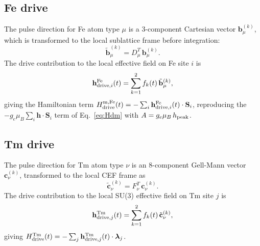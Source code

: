 \documentclass[11pt]{article}
\newcommand{\bS}{\mathbf{S}}
\newcommand{\bh}{\mathbf{h}}
\begin{document}
\subsection{Fe drive}

The pulse direction for Fe atom type $\mu$ is a 3-component Cartesian
vector $\mathbf{b}^{(k)}_\mu$, which is transformed to the local
sublattice frame before integration:
\begin{equation}
\tilde{\mathbf{b}}^{(k)}_\mu = D_\mu^T\,\mathbf{b}^{(k)}_\mu.
\end{equation}
The drive contribution to the local effective field on Fe site $i$ is
\begin{equation}
\mathbf{h}^{\rm Fe}_{{\rm drive},i}(t)
= \sum_{k=1}^{2} f_k(t)\,\tilde{\mathbf{b}}^{(k)}_\mu,
\end{equation}
giving the Hamiltonian term
$H_{\rm drive}^{\rm m,Fe}(t) = -\sum_i \mathbf{h}^{\rm Fe}_{{\rm drive},i}(t)\cdot\bS_i$,
reproducing the $-g_e\mu_B\sum_i\bh\cdot\bS_i$ term of
Eq.~\eqref{eq:Hdm} with $A = g_e\mu_B\,h_{\rm peak}$.

\subsection{Tm drive}

The pulse direction for Tm atom type $\nu$ is an 8-component Gell-Mann
vector $\mathbf{c}^{(k)}_\nu$, transformed to the local CEF frame as
\begin{equation}
\tilde{\mathbf{c}}^{(k)}_\nu = F_\nu^T\,\mathbf{c}^{(k)}_\nu.
\end{equation}
The drive contribution to the local SU(3) effective field on Tm site $j$
is
\begin{equation}
\mathbf{h}^{\rm Tm}_{{\rm drive},j}(t)
= \sum_{k=1}^{2} f_k(t)\,\tilde{\mathbf{c}}^{(k)}_\nu,
\end{equation}
giving
$H_{\rm drive}^{\rm Tm}(t) = -\sum_j
\mathbf{h}^{\rm Tm}_{{\rm drive},j}(t)\cdot\boldsymbol{\lambda}_j$.
\end{document}
